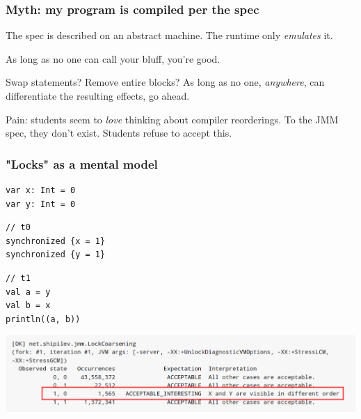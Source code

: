 \documentclass[aspectratio=1610, xcolor={dvipsnames}]{beamer}
\begin{document}

\begin{frame}
    \frametitle{Myth: my program is compiled per the spec}

    The spec is described on an abstract machine. The runtime only \emph{emulates} it.

    \pause

    As long as no one can call your bluff, you're good.

    \pause

    Swap statements? Remove entire blocks? As long as no one, \emph{anywhere},
    can differentiate the resulting effects, go ahead.

    \pause

    Pain: students seem to \emph{love} thinking about compiler reorderings. To
    the JMM spec, they don't exist. Students refuse to accept this.

\end{frame}

\begin{frame}[fragile]
    \frametitle{"Locks" as a mental model}

\begin{lstlisting}
var x: Int = 0
var y: Int = 0
\end{lstlisting}

\begin{multicols}{2}
\begin{lstlisting}
// t0
synchronized {x = 1}
synchronized {y = 1}
\end{lstlisting}

\columnbreak

\begin{lstlisting}
// t1
val a = y
val b = x
println((a, b))
\end{lstlisting}
\end{multicols}

\centering
\includegraphics[height=8em]{fig/xyswap.png}

\end{frame}
\end{document}
